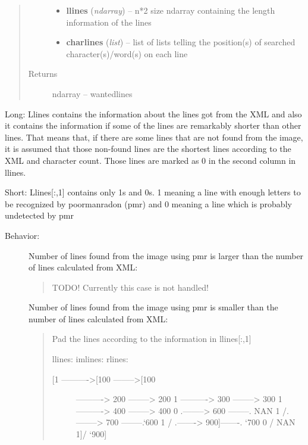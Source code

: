 \documentclass[letterpaper,10pt,english]{sphinxmanual}
\begin{document}
\begin{fulllineitems}
\begin{fulllineitems}
\begin{quote}
\begin{description}
\begin{itemize}
\item {} 
\textbf{llines} (\emph{ndarray}) -- n*2 size ndarray containing the length information of the lines

\item {} 
\textbf{charlines} (\emph{list}) -- list of lists telling the position(s) of searched character(s)/word(s) on each line

\end{itemize}

\item[{Returns}] \leavevmode
ndarray -- wantedlines

\end{description}\end{quote}

Long:
Llines contains the information about the lines got from the XML and also it contains the 
information if some of the lines are remarkably shorter than other lines. That means that, if there are some lines that 
are not found from the image, it is assumed that those non-found lines are the shortest lines according to the XML and 
character count. Those lines are marked as 0 in the second column in llines.

Short:
Llines{[}:,1{]} contains only 1s and 0s. 1 meaning a line with enough letters to be recognized by poormanradon (pmr) 
and 0 meaning a line which is probably undetected by pmr
\begin{description}
\item[{Behavior:}] \leavevmode
Number of lines found from the image using pmr is larger than 
the number of lines calculated from XML:
\begin{quote}

TODO! Currently this case is not handled!
\end{quote}

Number of lines found from the image using pmr is smaller than
the number of lines calculated from XML:
\begin{quote}

Pad the lines according to the information in llines{[}:,1{]}

llines:         imlines:                rlines:
\begin{description}
\item[{{[}1 ----------\textgreater{}{[}100 --------\textgreater{}{[}100}]  ----------\textgreater{} 200 --------\textgreater{} 200
1 ----------\textgreater{} 300 --------\textgreater{} 300
1 ----------\textgreater{} 400 --------\textgreater{} 400
0      .--------\textgreater{} 600 --------. NAN
1 /.--------\textgreater{} 700 --------.`600
1 / .-------\textgreater{} 900{]}-------. `700
0  /                                      NAN
1{]}/                                            `900{]}


\end{description}
\end{quote}
\end{description}
\end{fulllineitems}
\end{fulllineitems}
\end{document}
